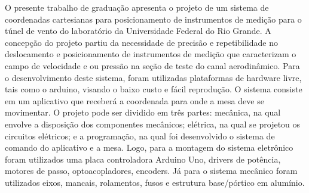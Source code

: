 O presente trabalho de graduação apresenta o projeto de um sistema de coordenadas cartesianas para 
posicionamento de instrumentos de medição para o túnel de vento do laboratório da Universidade 
Federal do Rio Grande. A concepção do projeto partiu da necessidade de precisão e repetibilidade  
no deslocamento  e posicionamento de instrumentos de medição  que caracterizam  o campo de velocidade 
e ou pressão na seção de teste do canal aerodinâmico. Para o desenvolvimento deste sistema, foram 
utilizadas plataformas de hardware livre, tais como o arduino, visando o baixo custo e fácil 
reprodução. O sistema consiste em um aplicativo que receberá a coordenada para onde a mesa deve 
se movimentar. O projeto pode ser dividido em três partes: mecânica, na qual envolve a disposição 
dos componentes mecânicos; elétrica, na qual se projetou os circuitos elétricos; e a programação, 
na qual foi desenvolvido o sistema de comando do aplicativo e a mesa. Logo, para a montagem do sistema 
eletrônico foram utilizados uma placa controladora  Arduino Uno, drivers de potência, motores de passo, 
optoacopladores, encoders. Já para o sistema mecânico foram utilizados eixos, mancais, rolamentos, 
fusos e estrutura base/pórtico em alumínio.

